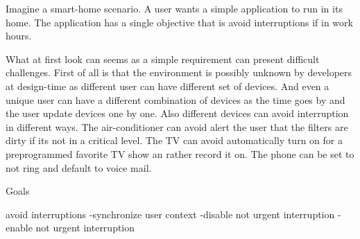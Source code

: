 

Imagine a smart-home scenario. A user wants a simple application to run in its home. The application has a single objective that is avoid interruptions if in work hours.

What at first look can seems as a simple requirement can present difficult challenges. First of all is that the environment is possibly unknown by developers at design-time as different user can have different set of devices. And even a unique user can have a different combination of devices as the time goes by and the user update devices one by one. Also different devices can avoid interruption in different ways. The air-conditioner can avoid alert the user that the filters are dirty if its not in a critical level. The TV can avoid automatically turn on for a preprogrammed favorite TV show an rather record it on. The phone can be set to not ring and default to voice mail.

Goals

avoid interruptions
-synchronize user context
-disable not urgent interruption
-enable not urgent interruption
